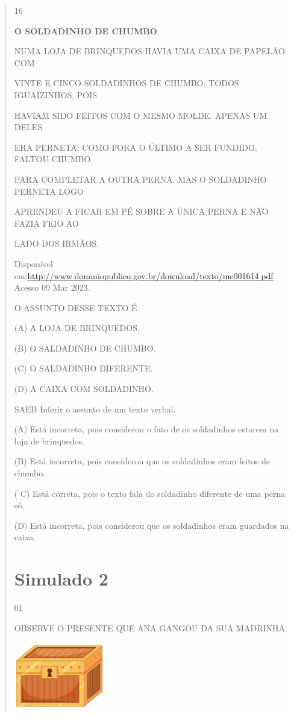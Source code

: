 \begin{verse}
{{{{{{{{{{{{{{{{\num{16}

\textbf{O SOLDADINHO DE CHUMBO}

NUMA LOJA DE BRINQUEDOS HAVIA UMA CAIXA DE PAPELÃO COM

VINTE E CINCO SOLDADINHOS DE CHUMBO, TODOS IGUAIZINHOS, POIS

HAVIAM SIDO FEITOS COM O MESMO MOLDE. APENAS UM DELES

ERA PERNETA: COMO FORA O ÚLTIMO A SER FUNDIDO, FALTOU CHUMBO

PARA COMPLETAR A OUTRA PERNA. MAS O SOLDADINHO PERNETA LOGO

APRENDEU A FICAR EM PÉ SOBRE A ÚNICA PERNA E NÃO FAZIA FEIO AO

LADO DOS IRMÃOS.

Disponível
em:\url{http://www.dominiopublico.gov.br/download/texto/me001614.pdf}
Acesso 09 Mar 2023.

O ASSUNTO DESSE TEXTO É

(A) A LOJA DE BRINQUEDOS.

(B) O SALDADINHO DE CHUMBO.

(C) O SALDADINHO DIFERENTE.

(D) A CAIXA COM SOLDADINHO.

SAEB Inferir o assunto de um texto verbal.

(A) Está incorreta, pois considerou o fato de os soldadinhos estarem na
loja de brinquedos.

(B) Está incorreta, pois considerou que os soldadinhos eram feitos de
chumbo.

( C) Está correta, pois o texto fala do soldadinho diferente de uma
perna só.

(D) Está incorreta, pois considerou que os soldadinhos eram guardados na
caixa.

\chapter{Simulado 2}

\num{01}

OBSERVE O PRESENTE QUE ANA GANGOU DA SUA MADRINHA.

\includegraphics[width=1.55556in,height=1.16111in]{media/image147.jpeg}

}}}}}}}}}}}}}}}}
\end{verse}
